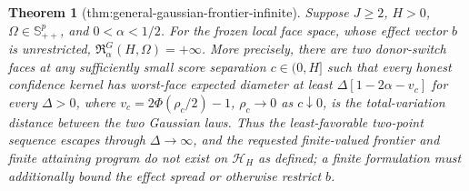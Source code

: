 \documentclass{article}
\newtheorem{theorem}{Theorem}
\begin{document}
\begin{theorem}[thm:general-gaussian-frontier-infinite]\label{thm:general-gaussian-frontier-infinite}
Suppose \(J\ge2\), \(H>0\), \(\Omega\in\mathbb S_{++}^p\), and \(0<\alpha<1/2\).  For the frozen local face space, whose effect vector \(b\) is unrestricted, \(\mathfrak R_{\alpha}^{G}(H,\Omega)=+\infty\).  More precisely, there are two donor-switch faces at any sufficiently small score separation \(c\in(0,H]\) such that every honest confidence kernel has worst-face expected diameter at least \(\Delta[1-2\alpha-v_c]\) for every \(\Delta>0\), where \(v_c=2\Phi(\rho_c/2)-1\), \(\rho_c\to0\) as \(c\downarrow0\), is the total-variation distance between the two Gaussian laws.  Thus the least-favorable two-point sequence escapes through \(\Delta\to\infty\), and the requested finite-valued frontier and finite attaining program do not exist on \(\mathcal H_H\) as defined; a finite formulation must additionally bound the effect spread or otherwise restrict \(b\).
\end{theorem}
\end{document}
